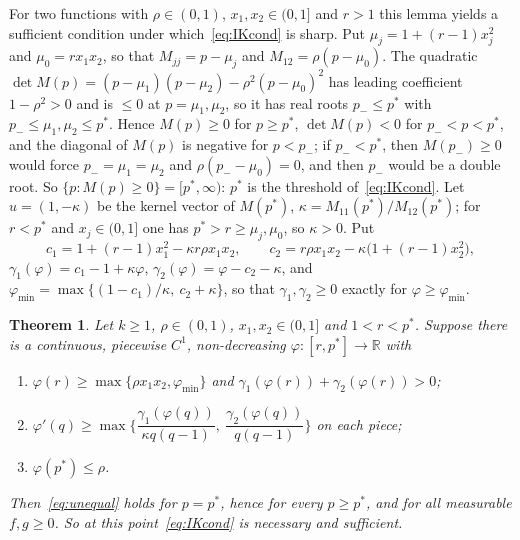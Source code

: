 \documentclass[11pt]{amsart}
\newtheorem{theorem}{Theorem}[section]
\theoremstyle{definition}
\newcommand{\R}{\mathbb{R}}
\begin{document}
For two functions with $\rho\in(0,1)$, $x_1,x_2\in(0,1]$ and $r>1$ this lemma yields a sufficient condition under which~\eqref{eq:IKcond} is sharp. Put
$\mu_j=1+(r-1)x_j^2$ and $\mu_0=rx_1x_2$, so that $M_{jj}=p-\mu_j$ and $M_{12}=\rho(p-\mu_0)$. The quadratic
$\det M(p)=(p-\mu_1)(p-\mu_2)-\rho^2(p-\mu_0)^2$ has leading coefficient $1-\rho^2>0$ and is $\le0$ at
$p=\mu_1,\mu_2$, so it has real roots $p_-\le p^*$ with $p_-\le\mu_1,\mu_2\le p^*$. Hence $M(p)\ge0$ for $p\ge p^*$,
$\det M(p)<0$ for $p_-<p<p^*$, and the diagonal of $M(p)$ is negative for $p<p_-$; if $p_-<p^*$, then $M(p_-)\ge0$ would
force $p_-=\mu_1=\mu_2$ and $\rho(p_--\mu_0)=0$, and then $p_-$ would be a double root. So
$\{p:M(p)\ge0\}=[p^*,\infty)$: $p^*$ is the threshold of~\eqref{eq:IKcond}. Let $u=(1,-\kappa)$ be the kernel vector of
$M(p^*)$, $\kappa=M_{11}(p^*)/M_{12}(p^*)$; for $r<p^*$ and $x_j\in(0,1]$ one has $p^*>r\ge\mu_j,\mu_0$, so $\kappa>0$. Put
\[
c_1=1+(r-1)x_1^2-\kappa r\rho x_1x_2,\qquad c_2=r\rho x_1x_2-\kappa\big(1+(r-1)x_2^2\big),
\]
$\gamma_1(\varphi)=c_1-1+\kappa\varphi$, $\gamma_2(\varphi)=\varphi-c_2-\kappa$, and
$\varphi_{\min}=\max\{(1-c_1)/\kappa,\ c_2+\kappa\}$, so that $\gamma_1,\gamma_2\ge0$ exactly for $\varphi\ge\varphi_{\min}$.

\begin{theorem}\label{thm:noise}
Let $k\ge1$, $\rho\in(0,1)$, $x_1,x_2\in(0,1]$ and $1<r<p^*$. Suppose there is a continuous, piecewise $C^1$,
non-decreasing $\varphi:[r,p^*]\to\R$ with
\begin{enumerate}[label=(\alph*)]
\item $\varphi(r)\ge\max\{\rho x_1x_2,\varphi_{\min}\}$ and $\gamma_1(\varphi(r))+\gamma_2(\varphi(r))>0$;
\item $\varphi'(q)\ge\max\Big\{\dfrac{\gamma_1(\varphi(q))}{\kappa q(q-1)},\ \dfrac{\gamma_2(\varphi(q))}{q(q-1)}\Big\}$ on each piece;
\item $\varphi(p^*)\le\rho$.
\end{enumerate}
Then~\eqref{eq:unequal} holds for $p=p^*$, hence for every $p\ge p^*$, and for all measurable $f,g\ge0$. So at this
point~\eqref{eq:IKcond} is necessary and sufficient.
\end{theorem}
\end{document}
